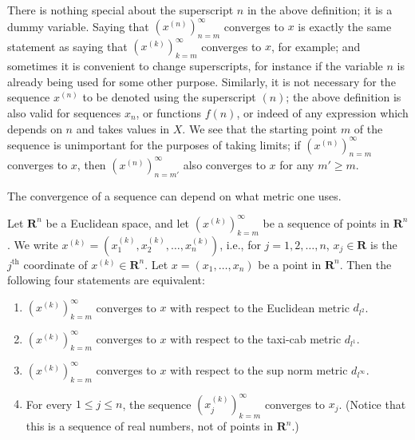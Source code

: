 \begin{remark}\label{1.1.16}
    There is nothing special about the superscript \(n\) in the above definition;
    it is a dummy variable.
    Saying that \((x^{(n)})_{n = m}^\infty\) converges to \(x\) is exactly the same statement as saying that \((x^{(k)})_{k = m}^\infty\) converges to \(x\), for example;
    and sometimes it is convenient to change superscripts, for instance if the variable \(n\) is already being used for some other purpose.
    Similarly, it is not necessary for the sequence \(x^{(n)}\) to be denoted using the superscript \((n)\);
    the above definition is also valid for sequences \(x_n\), or functions \(f(n)\), or indeed of any expression which depends on \(n\) and takes values in \(X\).
    We see that the starting point \(m\) of the sequence is unimportant for the purposes of taking limits;
    if \((x^{(n)})_{n = m}^\infty\) converges to \(x\), then \((x^{(n)})_{n = m'}^\infty\) also converges to \(x\) for any \(m' \geq m\).
\end{remark}

\begin{note}
    The convergence of a sequence can depend on what metric one uses.
\end{note}

\setcounter{theorem}{17}
\begin{proposition}\label{1.1.18}
    Let \(\mathbf{R}^n\) be a Euclidean space, and let \((x^{(k)})_{k = m}^\infty\) be a sequence of points in \(\mathbf{R}^n\).
    We write \(x^{(k)} = (x_1^{(k)}, x_2^{(k)}, \dots, x_n^{(k)})\), i.e., for \(j = 1, 2, \dots, n\), \(x_j \in \mathbf{R}\) is the \(j^{\text{th}}\) coordinate of \(x^{(k)} \in \mathbf{R}^n\).
    Let \(x = (x_1, \dots, x_n)\) be a point in \(\mathbf{R}^n\).
    Then the following four statements are equivalent:
    \begin{enumerate}
        \item \((x^{(k)})_{k = m}^\infty\) converges to \(x\) with respect to the Euclidean metric \(d_{l^2}\).
        \item \((x^{(k)})_{k = m}^\infty\) converges to \(x\) with respect to the taxi-cab metric \(d_{l^1}\).
        \item \((x^{(k)})_{k = m}^\infty\) converges to \(x\) with respect to the sup norm metric \(d_{l^\infty}\).
        \item For every \(1 \leq j \leq n\), the sequence \((x_j^{(k)})_{k = m}^\infty\) converges to \(x_j\).
              (Notice that this is a sequence of real numbers, not of points in \(\mathbf{R}^n\).)
    \end{enumerate}
\end{proposition}


